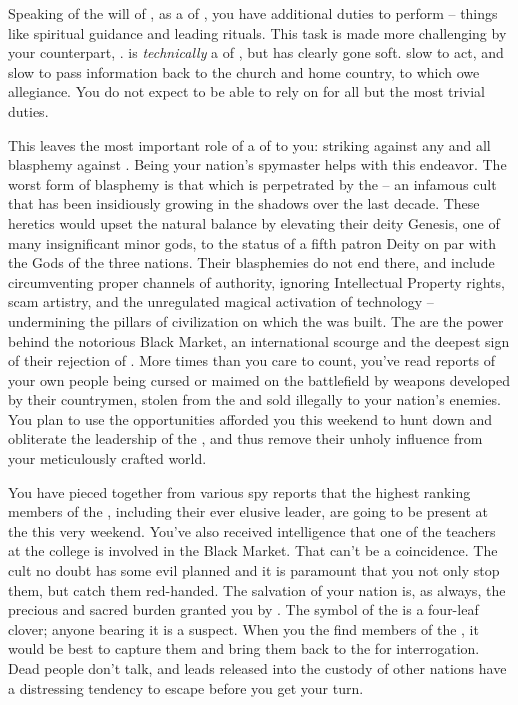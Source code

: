 \documentclass[char]{GL2020}
\begin{document}
Speaking of the will of \cTechGod{}, as a \cAntiChup{\cleric} of \cTechGod{}, you have additional duties to perform -- things like spiritual guidance and leading rituals. This task is made more challenging by your counterpart, \cBeetle{\full}. \cBeetle{} is \emph{technically} a \cBeetle{\cleric} of \cTechGod{}, but has clearly gone soft. \cBeetle{\Theyare} slow to act, and slow to pass information back to the church and \cBeetle{\their} home country, to which \cBeetle{\they} owe\cBeetle{\plural} allegiance. You do not expect to be able to rely on \cBeetle{} for all but the most trivial duties.

This leaves the most important role of a \cAntiChup{\cleric} of \cTechGod{} to you: striking against any and all blasphemy against \cTechGod{}. Being your nation's spymaster helps with this endeavor. The worst form of blasphemy is that which is perpetrated by the \pGoaties{} -- an infamous cult that has been insidiously growing in the shadows over the last decade. These heretics would upset the natural balance by elevating their deity Genesis, one of many insignificant minor gods, to the status of a fifth patron Deity on par with the Gods of the three nations. Their blasphemies do not end there, and include circumventing proper channels of authority, ignoring Intellectual Property rights, scam artistry, and the unregulated magical activation of technology -- undermining the pillars of civilization on which the \pTech{} was built. The \pGoaties{} are the power behind the notorious Black Market, an international scourge and the deepest sign of their rejection of \cTechGod{}. More times than you care to count, you've read reports of your own people being cursed or maimed on the battlefield by weapons developed by their countrymen, stolen from the \pTech{} and sold illegally to your nation's enemies. You plan to use the opportunities afforded you this weekend to hunt down and obliterate the leadership of the \pGoaties{}, and thus remove their unholy influence from your meticulously crafted world. 

You have pieced together from various spy reports that the highest ranking members of the \pGoaties{}, including their ever elusive leader, are going to be present at the \pSchool{} this very weekend. You've also received intelligence that one of the \pTech{} teachers at the college is involved in the Black Market. That can't be a coincidence. The cult no doubt has some evil planned and it is paramount that you not only stop them, but catch them red-handed. The salvation of your nation is, as always, the precious and sacred burden granted you by \cTechGod{}. The symbol of the \pGoaties{} is a four-leaf clover; anyone bearing it is a suspect. When you the find members of the \pGoaties{}, it would be best to capture them and bring them back to the \pTech{} for interrogation. Dead people don't talk, and leads released into the custody of other nations have a distressing tendency to escape before you get your turn.
\end{document}
